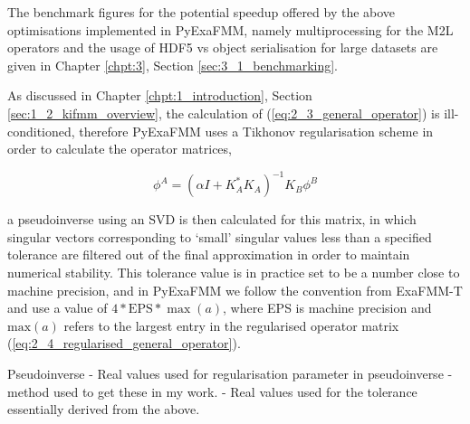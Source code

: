 The  benchmark figures for the potential speedup offered by the above optimisations
implemented in \gls{PyExaFMM}, namely multiprocessing for the \gls{M2L} operators
and the usage of HDF5 vs object serialisation for large datasets are given
in Chapter \ref{chpt:3}, Section \ref{sec:3_1_benchmarking}.

As discussed in Chapter \ref{chpt:1_introduction}, Section \ref{sec:1_2_kifmm_overview},
the calculation of (\ref{eq:2_3_general_operator}) is ill-conditioned, therefore
\gls{PyExaFMM} uses a Tikhonov regularisation scheme in order to calculate the
operator matrices,

\begin{equation}
    \phi^A = (\alpha I + K_A^*K_A)^{-1}K_B\phi^B
    \label{eq:2_4_regularised_general_operator}
\end{equation}

a pseudoinverse using an \gls{SVD} is then calculated for this matrix, in which
singular vectors corresponding to `small' singular values less than a specified
tolerance are filtered out of the final approximation in order to maintain
numerical stability. This tolerance value is in practice set to be a number close
to machine precision, and in \gls{PyExaFMM} we follow the convention from ExaFMM-T
and use a value of $4*\text{EPS}*\max(a)$, where EPS is machine precision and
$\text{max}(a)$ refers to the largest entry in the regularised operator matrix
(\ref{eq:2_4_regularised_general_operator}).

Pseudoinverse
- Real values used for regularisation parameter in pseudoinverse
    - method used to get these in my work.
    - Real values used for the tolerance essentially derived from the above.

